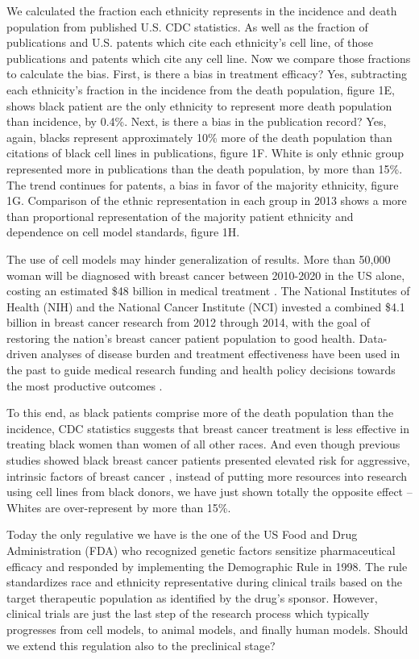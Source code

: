 \documentclass[10pt]{article}
\begin{document}
\begin{multicols}{2}
We calculated the fraction each ethnicity represents in the incidence and death population from published U.S. CDC statistics. As well as the fraction of publications and U.S. patents which cite each ethnicity's cell line, of those publications and patents which cite any cell line. Now we compare those fractions to calculate the bias. First, is there a bias in treatment efficacy? Yes, subtracting each ethnicity's fraction in the incidence from the death population, figure 1E, shows black patient are the only ethnicity to represent more death population than incidence, by 0.4\%. Next, is there a bias in the publication record? Yes, again, blacks represent approximately 10\% more of the death population than citations of black cell lines in publications, figure 1F. White is only ethnic group represented  more in publications than the death population, by more than 15\%.  The trend continues for patents, a bias in favor of the majority ethnicity, figure 1G. Comparison of the ethnic representation in each group in 2013 shows a more than proportional representation of the majority patient ethnicity and dependence on cell model standards, figure 1H. 

The use of cell models may hinder generalization of results. More than 50,000 woman will be diagnosed with breast cancer between 2010-2020 in the US alone, costing an estimated \$48 billion in medical treatment \cite{mariotto2011projections, weir2015past}. The National Institutes of Health (NIH) and the National Cancer Institute (NCI) invested a combined \$4.1 billion in breast cancer research from 2012 through 2014, with the goal of restoring the nation's breast cancer patient population to good health. Data-driven analyses of disease burden and treatment effectiveness have been used in the past to guide medical research funding and health policy decisions towards the most productive outcomes \cite{kim2016cancer}. 

To this end, as black patients comprise more of the death population than the incidence, CDC statistics suggests that breast cancer treatment is less effective in treating black women than women of all other races. And even though previous studies showed black breast cancer patients presented elevated risk for aggressive, intrinsic factors of breast cancer \cite{huo2009population, reding2012examination}, instead of putting more resources into research using cell lines from black donors, we have just shown totally the opposite effect -- Whites are over-represent by more than 15\%.

Today the only regulative we have is the one of the US Food and Drug Administration (FDA) who recognized genetic factors sensitize pharmaceutical efficacy and responded by implementing the Demographic Rule in 1998. The rule standardizes race and ethnicity representative during clinical trails based on the target therapeutic population as identified by the drug's sponsor. However, clinical trials are just the last step of the research process which typically progresses from cell models, to animal models, and finally human models. Should we extend this regulation also to the preclinical stage?


\end{multicols}
\end{document}
